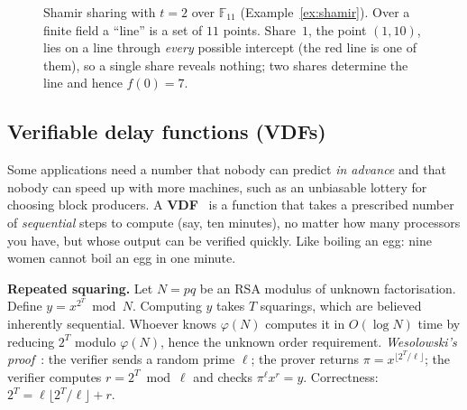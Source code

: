 \documentclass[11pt,a4paper]{article}
\newenvironment{plainenglish}{\par\smallskip}{\par\smallskip}
\newenvironment{formal}{\par\smallskip}{\par\smallskip}
\theoremstyle{definition}
\theoremstyle{plain}
\theoremstyle{remark}
\newcommand{\F}{\mathbb{F}}
\begin{document}
\begin{figure}[htbp]
\centering
{}
\caption{Shamir sharing with $t=2$ over $\F_{11}$ (Example~\ref{ex:shamir}). Over a finite field a ``line'' is a set of $11$ points. Share~$1$, the point $(1,10)$, lies on a line through \emph{every} possible intercept (the red line is one of them), so a single share reveals nothing; two shares determine the line and hence $f(0)=7$.}
\end{figure}

\subsection{Verifiable delay functions (VDFs)}

\begin{plainenglish}
Some applications need a number that nobody can predict \emph{in advance} and that nobody can speed up with more machines, such as an unbiasable lottery for choosing block producers. A \textbf{VDF}~\cite{BBBF18} is a function that takes a prescribed number of \emph{sequential} steps to compute (say, ten minutes), no matter how many processors you have,
but whose output can be verified quickly. Like boiling an egg: nine women cannot boil an egg in one minute.
\end{plainenglish}

\begin{formal}
\textbf{Repeated squaring.} Let $N=pq$ be an RSA modulus of unknown factorisation. Define $y=x^{2^T}\bmod N$. Computing $y$ takes $T$ squarings, which are believed inherently sequential. Whoever knows $\varphi(N)$ computes it in $O(\log N)$ time by reducing $2^T$ modulo $\varphi(N)$, hence the unknown order requirement.
\emph{Wesolowski's proof}~\cite{Wes19}: the verifier sends a random prime $\ell$; the prover returns $\pi=x^{\lfloor2^T/\ell\rfloor}$; the verifier computes $r=2^T\bmod\ell$ and checks $\pi^\ell x^r=y$. Correctness: $2^T=\ell\lfloor2^T/\ell\rfloor+r$.
\end{formal}
\end{document}

